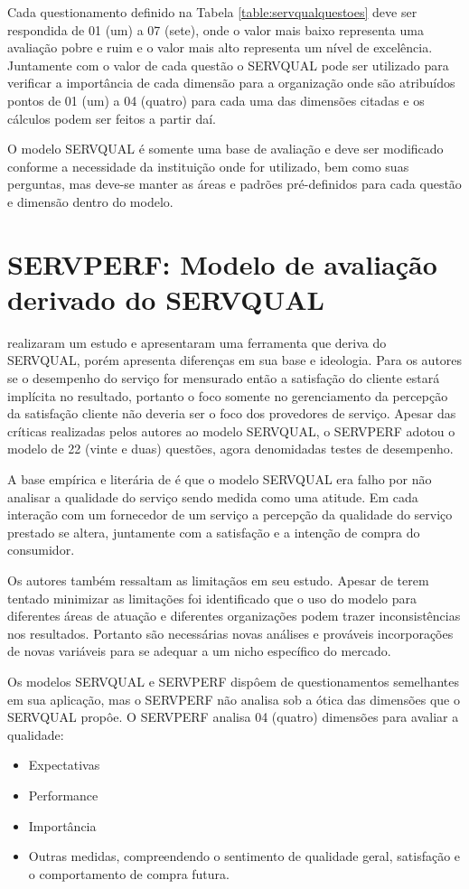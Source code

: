 Cada questionamento definido na Tabela \ref{table:servqualquestoes} deve ser respondida de 01 (um) a 07 (sete), onde o valor mais baixo representa uma avaliação pobre e ruim e o valor mais alto representa um nível de excelência. Juntamente com o valor de cada questão o SERVQUAL pode ser utilizado para verificar a importância de cada dimensão para a organização onde são atribuídos pontos de 01 (um) a 04 (quatro) para cada uma das dimensões citadas e os cálculos podem ser feitos a partir daí. \cite[p.~31]{parasuraman1988}

O modelo SERVQUAL é somente uma base de avaliação e deve ser modificado conforme a necessidade da instituição onde for utilizado, bem como suas perguntas, mas deve-se manter as áreas e padrões pré-definidos para cada questão e dimensão dentro do modelo. \cite[p.~9]{parasuraman1991} 


\section{SERVPERF: Modelo de avaliação derivado do SERVQUAL}
\cite{cronintaylor1992} realizaram um estudo e apresentaram uma ferramenta que deriva do SERVQUAL, porém apresenta diferenças em sua base e ideologia. Para os autores se o desempenho do serviço for mensurado então a satisfação do cliente estará implícita no resultado, portanto o foco somente no gerenciamento da percepção da satisfação cliente não deveria ser o foco dos provedores de serviço. Apesar das críticas realizadas pelos autores ao modelo SERVQUAL, o SERVPERF adotou o modelo de 22 (vinte e duas) questões, agora denomidadas testes de desempenho.

A base empírica e literária de \cite{cronintaylor1992} é que o modelo SERVQUAL era falho por não analisar a qualidade do serviço sendo medida como uma atitude. Em cada interação com um fornecedor de um serviço a percepção da qualidade do serviço prestado se altera, juntamente com a satisfação e a intenção de compra do consumidor. 

Os autores também ressaltam as limitaçãos em seu estudo. Apesar de terem tentado minimizar as limitações foi identificado que o uso do modelo para diferentes áreas de atuação e diferentes organizações podem trazer inconsistências nos resultados. Portanto são necessárias novas análises e prováveis incorporações de novas variáveis para se adequar a um nicho específico do mercado.

Os modelos SERVQUAL e SERVPERF dispôem de questionamentos semelhantes em sua aplicação, mas o SERVPERF não analisa sob a ótica das dimensões que o SERVQUAL propôe. O SERVPERF analisa 04 (quatro) dimensões para avaliar a qualidade: \cite[p.~65-67]{cronintaylor1992}
\begin{itemize}
	\item Expectativas
	\item Performance
	\item Importância
	\item Outras medidas, compreendendo o sentimento de qualidade geral, satisfação e o comportamento de compra futura.
\end{itemize} 


